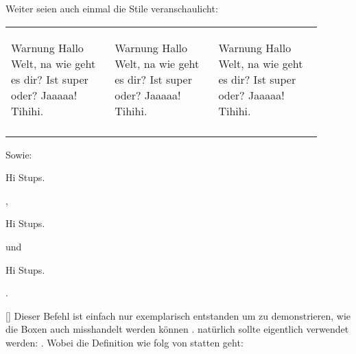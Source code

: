 Weiter seien auch einmal die Stile veranschaulicht:\nskip
{}
\begin{center}
    \begin{tabular}{*{3}{C{0.3\linewidth} }}
        \begin{warningBoxNone}{Warnung}
            Hallo Welt, na wie geht es dir? Ist super oder? Jaaaaa! Tihihi.
        \end{warningBoxNone} & \begin{warningBoxFramed}{Warnung}
            Hallo Welt, na wie geht es dir? Ist super oder? Jaaaaa! Tihihi.
        \end{warningBoxFramed} & \begin{warningBox}{Warnung}
            Hallo Welt, na wie geht es dir? Ist super oder? Jaaaaa! Tihihi.
        \end{warningBox}\\[-2\baselineskip]
         &  & 
    \end{tabular}
\end{center}
Sowie: \begin{warningBoxNone*}{Hi}
    Stups.
\end{warningBoxNone*}, \begin{warningBoxFramed*}{Hi}
    Stups.
\end{warningBoxFramed*}{} und \begin{warningBox*}{Hi}
    Stups.
\end{warningBox*}.

%
%
%

[]
Dieser Befehl ist einfach nur exemplarisch entstanden um zu demonstrieren, wie die Boxen auch misshandelt werden können \Smiley. natürlich sollte eigentlich  verwendet werden: \!\!\dateBox{\heute}. Wobei die Definition wie folg von statten geht:

